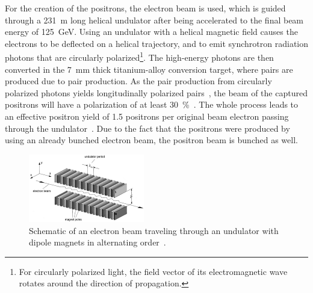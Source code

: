 For the creation of the positrons, the electron beam is used, which is guided through a \SI{231}{\meter} long helical undulator after being accelerated to the final beam energy of \SI{125}{\GeV}.
Using an undulator with a helical magnetic field causes the electrons to be deflected on a helical trajectory, and to emit synchrotron radiation photons that are circularly polarized\footnote{For circularly polarized light, the field vector of its electromagnetic wave rotates around the direction of propagation.}.
The high-energy photons are then converted in the \SI{7}{\milli\meter} thick titanium-alloy conversion target, where \positron \electron pairs are produced due to pair production.
As the pair production from circularly polarized photons yields longitudinally polarized \positron \electron pairs~\cite{Polarization}, the beam of the captured positrons will have a polarization of at least \SI{30}{\percent}~\cite[p. 14]{TDR32}.
The whole process leads to an effective positron yield of 1.5 positrons per original beam electron passing through the undulator~\cite{Ushakov}.
Due to the fact that the positrons were produced by using an already bunched electron beam, the positron beam is bunched as well. 
\begin{figure}
\centering
\includegraphics[width=0.45\textwidth]{Figures/Undulator_edited.png}
\caption[Schematic layout of an undulator]{Schematic of an electron beam traveling through an undulator with dipole magnets in alternating order~\cite[based on p. 41]{Wille}.}
\label{fig:Undulator}
\end{figure}
